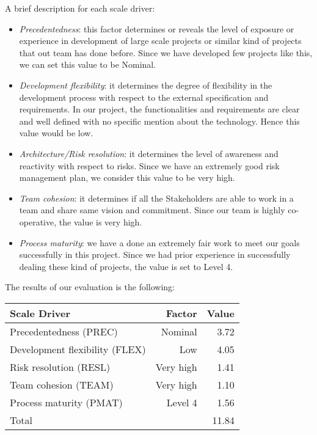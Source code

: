 A brief description for each scale driver:
\begin{itemize}
	\item \emph{Precedentedness}: this factor determines or reveals the level of exposure or experience in development of large scale projects or similar kind of projects that out team has done before. Since we have developed few projects like this, we can set this value to be Nominal.
	\item \emph{Development flexibility}: it determines the degree of flexibility in the development process with respect to the external specification and requirements. In our project, the functionalities and requirements are clear and well defined with no specific mention about the technology. Hence this value would be low.
	\item \emph{Architecture/Risk resolution}: it determines the level of awareness and reactivity with
respect to risks. Since we have an extremely good risk management plan, we consider this value to be very high.
	\item \emph{Team cohesion}: it determines if all the Stakeholders are able to work in a team and share same vision and commitment. Since our team is highly co-operative,
	the value is very high.
	\item \emph{Process maturity}: we have a done an extremely fair work to meet our goals successfully in this project. Since we had prior experience in successfully dealing these kind of projects, the value is set to Level 4.
\end{itemize}

The results of our evaluation is the following:

\begin{table}[H]
	\centering
	\begin{tabular}{|l|r|r|}
		\hline
		Scale Driver & Factor & Value \\
		\hline
		Precedentedness (PREC) & Nominal & 3.72
 \\
		Development flexibility (FLEX) & Low & 4.05
\\
		Risk resolution (RESL) & Very high & 1.41 \\
		Team cohesion (TEAM) & Very high & 1.10 \\
		Process maturity (PMAT) & Level 4 & 1.56
\\
		\hline
		\multicolumn{2}{|l|}{Total} & 11.84 \\
		\hline	
	\end{tabular}
\end{table}

